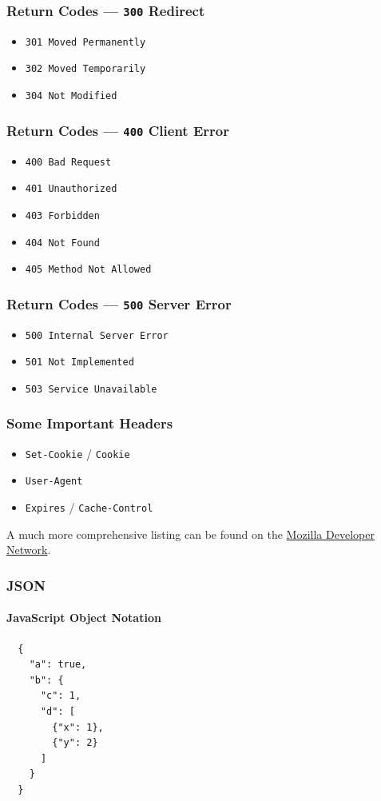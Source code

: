 \documentclass{beamer}
\begin{document}
\begin{frame}
  \frametitle{Return Codes --- \texttt{300} Redirect}
  \begin{itemize}
    \item \texttt{301 Moved Permanently}
    \item \texttt{302 Moved Temporarily}
    \item \texttt{304 Not Modified}
  \end{itemize}
\end{frame}


\begin{frame}
  \frametitle{Return Codes --- \texttt{400} Client Error}
  \begin{itemize}
    \item \texttt{400 Bad Request}
    \item \texttt{401 Unauthorized}
    \item \texttt{403 Forbidden}
    \item \texttt{404 Not Found}
    \item \texttt{405 Method Not Allowed}
  \end{itemize}
\end{frame}


\begin{frame}
  \frametitle{Return Codes --- \texttt{500} Server Error}
  \begin{itemize}
    \item \texttt{500 Internal Server Error}
    \item \texttt{501 Not Implemented}
    \item \texttt{503 Service Unavailable}
  \end{itemize}
\end{frame}


\begin{frame}
  \frametitle{Some Important Headers}
  \begin{itemize}
    \item \texttt{Set-Cookie} / \texttt{Cookie}
    \item \texttt{User-Agent}
    \item \texttt{Expires} / \texttt{Cache-Control}
  \end{itemize}

  A much more comprehensive listing can be found on the \href{https://developer.mozilla.org/en-US/docs/Web/HTTP/Headers}{Mozilla Developer Network}.
\end{frame}


\begin{frame}[fragile=singleslide]
  \frametitle{JSON}
  \framesubtitle{JavaScript Object Notation}
  \begin{Verbatim}
  {
    "a": true,
    "b": {
      "c": 1,
      "d": [
        {"x": 1},
        {"y": 2}
      ]
    }
  }
	\end{Verbatim}
\end{frame}
\end{document}

